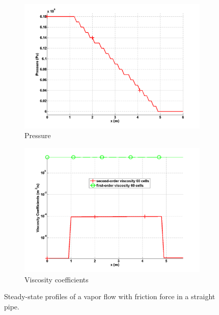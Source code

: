 \begin{figure}[H]
        \begin{subfigure}[b]{0.495\textwidth}
                \centering
                \includegraphics[width=\textwidth]{figures/vapor_friction_pressure_source_terms.png}
                \caption{Pressure}
                \label{fig:1d-vapor-friction-pressure-sct3}
        \end{subfigure}
        \begin{subfigure}[b]{0.495\textwidth}
                \centering
                \includegraphics[width=\textwidth]{figures/vapor_friction_viscosity_source_terms.png}
                \caption{Viscosity coefficients}
                \label{fig:1d-vapor-friction-visc-sct3}
        \end{subfigure}
        \caption{Steady-state profiles of a vapor flow with friction force in a straight pipe.}
				\label{fig:1d-vapor-friction-sct3}
\end{figure}
